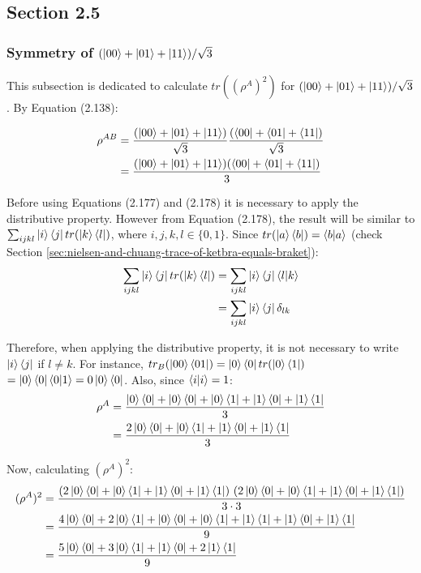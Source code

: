 \subsection{Section 2.5}
\subsubsection[Symmetry of Triple State Entanglement]
{Symmetry of $(\ket{00} + \ket{01} + \ket{11})/\sqrt{3}$}
\label{sec:nielsen-and-chuang-symmetry-of-triple-state-entanglement}

This subsection is dedicated to calculate $tr((\rho^A)^2)$
for $(\ket{00} + \ket{01} + \ket{11})/\sqrt{3}$. By Equation (2.138):

\begin{align}
    \rho^{AB} &= \frac{(\ket{00} + \ket{01} + \ket{11})}{\sqrt{3}}
        \frac{(\bra{00} + \bra{01} + \bra{11})}{\sqrt{3}} \\
        &= \frac{(\ket{00} + \ket{01} + \ket{11})(\bra{00} + \bra{01} + \bra{11})}{3}
\end{align}

Before using Equations (2.177) and (2.178) it is necessary to apply the distributive property.
However from Equation (2.178), the result will be similar to
$\sum_{ijkl} \ket{i}\bra{j} tr(\ket{k}\bra{l})$, where $i, j, k, l \in \{0, 1\}$.
Since $tr(\ket{a}\bra{b}) = \mathop{\mathinner{ \langle{b}|{a}\rangle}}$
(check Section \ref{sec:nielsen-and-chuang-trace-of-ketbra-equals-braket}):
\begin{align}
    \sum_{ijkl} \ket{i}\bra{j} tr(\ket{k}\bra{l}) &=
        \sum_{ijkl} \ket{i}\bra{j}\mathop{\mathinner{ \langle{l}|{k}\rangle}} \\
        &= \sum_{ijkl} \ket{i}\bra{j}\delta_{lk}
\end{align}

Therefore, when applying the distributive property,
it is not necessary to write $\ket{i}\bra{j}$ if $l \neq k$.
For instance,
$tr_B(\ket{00}\bra{01}) = \ket{0}\bra{0}tr(\ket{0}\bra{1})$
$= \ket{0}\bra{0}\mathop{\mathinner{ \langle{0}|{1}\rangle}} = 0 \ket{0}\bra{0}$.
Also, since $\mathop{\mathinner{ \langle{i}|{i}\rangle}} = 1$:
\begin{align}
    \rho^A &= \frac{\ket{0}\bra{0} + \ket{0}\bra{0} + \ket{0}\bra{1} +
        \ket{1}\bra{0} + \ket{1}\bra{1}}{3} \\
    &= \frac{2\ket{0}\bra{0} + \ket{0}\bra{1} +
        \ket{1}\bra{0} + \ket{1}\bra{1}}{3}
\end{align}

Now, calculating $(\rho^A)^2$:
\begin{align}
    (\rho^A)^2 &= \frac{(2\ket{0}\bra{0} + \ket{0}\bra{1} +
        \ket{1}\bra{0} + \ket{1}\bra{1})\ (2\ket{0}\bra{0} + \ket{0}\bra{1} +
        \ket{1}\bra{0} + \ket{1}\bra{1})}{3 \cdot 3} \\
    &= \frac{4\ket{0}\bra{0} + 2\ket{0}\bra{1} + \ket{0}\bra{0} + \ket{0}\bra{1} +
        \ket{1}\bra{1} + \ket{1}\bra{0} + \ket{1}\bra{1}}{9} \\
    &= \frac{5\ket{0}\bra{0} + 3\ket{0}\bra{1} + \ket{1}\bra{0} + 2\ket{1}\bra{1}}{9}
\end{align}

